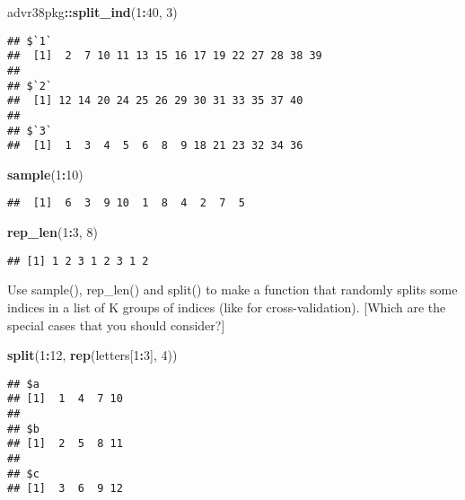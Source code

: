 \documentclass[]{article}
\newenvironment{Shaded}{\begin{snugshade}}{\end{snugshade}}
\newcommand{\DecValTok}[1]{\textcolor[rgb]{0.00,0.00,0.81}{#1}}
\newcommand{\KeywordTok}[1]{\textcolor[rgb]{0.13,0.29,0.53}{\textbf{#1}}}
\newcommand{\NormalTok}[1]{#1}
\newcommand{\OperatorTok}[1]{\textcolor[rgb]{0.81,0.36,0.00}{\textbf{#1}}}
\begin{document}
\begin{Shaded}
\begin{Highlighting}[]
\NormalTok{advr38pkg}\OperatorTok{::}\KeywordTok{split_ind}\NormalTok{(}\DecValTok{1}\OperatorTok{:}\DecValTok{40}\NormalTok{, }\DecValTok{3}\NormalTok{)}
\end{Highlighting}
\end{Shaded}

\begin{verbatim}
## $`1`
##  [1]  2  7 10 11 13 15 16 17 19 22 27 28 38 39
## 
## $`2`
##  [1] 12 14 20 24 25 26 29 30 31 33 35 37 40
## 
## $`3`
##  [1]  1  3  4  5  6  8  9 18 21 23 32 34 36
\end{verbatim}

\begin{Shaded}
\begin{Highlighting}[]
\KeywordTok{sample}\NormalTok{(}\DecValTok{1}\OperatorTok{:}\DecValTok{10}\NormalTok{)}
\end{Highlighting}
\end{Shaded}

\begin{verbatim}
##  [1]  6  3  9 10  1  8  4  2  7  5
\end{verbatim}

\begin{Shaded}
\begin{Highlighting}[]
\KeywordTok{rep_len}\NormalTok{(}\DecValTok{1}\OperatorTok{:}\DecValTok{3}\NormalTok{, }\DecValTok{8}\NormalTok{)}
\end{Highlighting}
\end{Shaded}

\begin{verbatim}
## [1] 1 2 3 1 2 3 1 2
\end{verbatim}

Use sample(), rep\_len() and split() to make a function that randomly
splits some indices in a list of K groups of indices (like for
cross-validation). {[}Which are the special cases that you should
consider?{]}

\begin{Shaded}
\begin{Highlighting}[]
\KeywordTok{split}\NormalTok{(}\DecValTok{1}\OperatorTok{:}\DecValTok{12}\NormalTok{, }\KeywordTok{rep}\NormalTok{(letters[}\DecValTok{1}\OperatorTok{:}\DecValTok{3}\NormalTok{], }\DecValTok{4}\NormalTok{))}
\end{Highlighting}
\end{Shaded}

\begin{verbatim}
## $a
## [1]  1  4  7 10
## 
## $b
## [1]  2  5  8 11
## 
## $c
## [1]  3  6  9 12
\end{verbatim}
\end{document}
